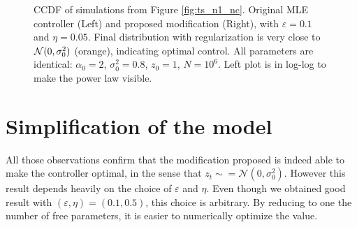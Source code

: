 \documentclass[FinalReport.tex]{subfiles}
\begin{document}
\begin{figure}[h!]%
\centering
	\centering
	\caption{CCDF of simulations from Figure \ref{fig:ts_n1_nc}. Original MLE controller (Left) and proposed modification (Right), with $\varepsilon=0.1$ and $\eta=0.05$. Final distribution with regularization is very close to $\mathcal{N}(0,\sigma_0^2)$ (orange), indicating optimal control. 
	All parameters are identical: $\alpha_0=2$, $\sigma_0^2=0.8$, $z_0=1$, $N=10^6$. Left plot is in log-log to make the power law visible.}
	\label{fig:dist_n1_nc}	
\end{figure}

\section{Simplification of the model}
All those observations confirm that the modification proposed is indeed able to make the controller optimal, in the sense that $z_t\sim =\mathcal{N}(0,\sigma_0^2)$. However this result depends heavily on the choice of $\varepsilon$ and $\eta$. Even though we obtained good result with $(\varepsilon,\eta)=(0.1,0.5)$, this choice is arbitrary. By reducing to one the number of free parameters, it is easier to numerically optimize the value.
\end{document}
